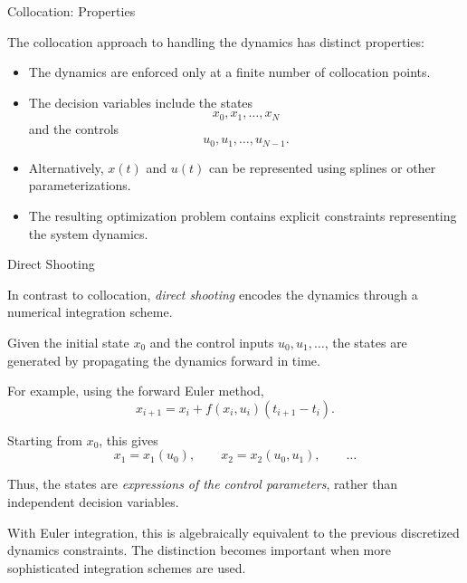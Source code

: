 \documentclass{beamer}
\begin{document}
\begin{frame}{Collocation: Properties}
	\begin{flushleft}
		The collocation approach to handling the dynamics has
		distinct properties:
		
		\vspace{0.5em}
		
		\begin{itemize}
			\item The dynamics are enforced only at a finite number
			of collocation points.
			
			\vspace{0.5em}
			
			\item The decision variables include the states
			\[
			x_0,x_1,\ldots,x_N
			\]
			and the controls
			\[
			u_0,u_1,\ldots,u_{N-1}.
			\]
			
			\vspace{0.5em}
			
			\item Alternatively, $x(t)$ and $u(t)$ can be represented
			using splines or other parameterizations.
			
			\vspace{0.5em}
			
			\item The resulting optimization problem contains
			explicit constraints representing the system dynamics.
		\end{itemize}
	\end{flushleft}
\end{frame}

\begin{frame}{Direct Shooting}
	\begin{flushleft}
		
		{\small 
		In contrast to collocation, \emph{direct shooting} encodes
		the dynamics through a numerical integration scheme.
		
		\vspace{0.5em}
		
		Given the initial state $x_0$ and the control inputs
		$u_0,u_1,\ldots$, the states are generated by propagating
		the dynamics forward in time.
		
		\vspace{0.5em}
		
		For example, using the forward Euler method,
		\[
		x_{i+1}
		=
		x_i
		+
		f(x_i,u_i)
		(t_{i+1}-t_i).
		\]
		
		Starting from $x_0$, this gives
		\[
		x_1=x_1(u_0),
		\qquad
		x_2=x_2(u_0,u_1),
		\qquad\ldots
		\]
		
		Thus, the states are \emph{expressions of the control
			parameters}, rather than independent decision variables.
		
		\vspace{0.5em}
		
		With Euler integration, this is algebraically equivalent
		to the previous discretized dynamics constraints. The distinction becomes important when more sophisticated
		integration schemes are used.
	}
	\end{flushleft}
\end{frame}
\end{document}
